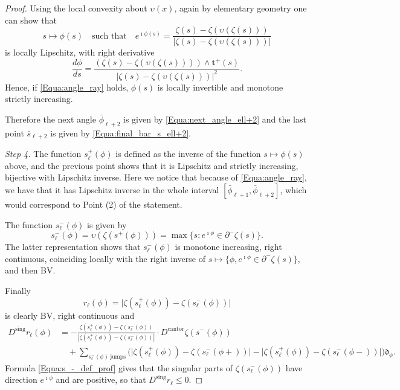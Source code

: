 \documentclass[reqno]{amsart}
\theoremstyle{definition} \newtheorem{definition}{Definition}[section]
\theoremstyle{definition} \newtheorem{remark}[definition]{Remark}
\theoremstyle{plain} \newtheorem{lemma}[definition]{Lemma}
\theoremstyle{plain} \newtheorem{proposition}[definition]{Proposition}
\theoremstyle{plain} \newtheorem{theorem}[definition]{Theorem}
\theoremstyle{plain} \newtheorem{corollary}[definition]{Corollary}
\theoremstyle{definition} \newtheorem{example}[definition]{Example}
\theoremstyle{plain} \newtheorem{claim}[clai]{Claim}
\theoremstyle{definition} \newtheorem{assumption}[definition]{Assumption}
\theoremstyle{definition} \newtheorem{observation}[definition]{Observation}
\newcommand{\sing}{\mathrm{sing}}
\newcommand{\1}{\mathbbm 1}
\newcommand{\Diracd}{\mathfrak{d}}
\renewcommand{\i}{\imath}
\numberwithin{equation}{section} %
\theoremstyle{plain} \newtheorem*{theorem*}{Theorem}
\theoremstyle{plain} \newtheorem{mthm}[maintheorem]{Main Theorem}
\theoremstyle{plain} \newtheorem*{mthm*}{Main Theorem}
\theoremstyle{plain} \newtheorem*{conjecture*}{Conjecture}
\theoremstyle{plain} \newtheorem{conjecture}[definition]{Conjecture}
\theoremstyle{plain} \newtheorem*{problem*}{Problem}
\begin{document}
\begin{proof}
Using the local convexity about $\upsilon(x)$, again by elementary geometry one can show that
\begin{equation*}
s \mapsto \phi(s) \quad \text{such that} \quad e^{\i \phi(s)} = \frac{\zeta(s) - \zeta(\upsilon(\zeta(s)))}{|\zeta(s) - \zeta(\upsilon(\zeta(s)))|}
\end{equation*}
is locally Lipschitz, with right derivative
\begin{equation}
\label{Equa:inverse_der_r_phi}
\frac{d\phi}{ds} = \frac{(\zeta(s) - \zeta(\upsilon(\zeta(s)))) \wedge \mathbf t^+(s)}{|\zeta(s) - \zeta(\upsilon(\zeta(s)))|^2}.
\end{equation}
Hence, if \eqref{Equa:angle_ray} holds, $\phi(s)$ is locally invertible and monotone strictly increasing.

Therefore the next angle $\bar \phi_{\ell+2}$ is given by \eqref{Equa:next_angle_ell+2} and the last point $\bar s_{\ell+2}$ is given by \eqref{Equa:final_bar_s_ell+2}.

\medskip

{\it Step 4.} The function $s^+_\ell(\phi)$ is defined as the inverse of the function $s \mapsto \phi(s)$ above, and the previous point shows that it is Lipschitz and strictly increasing, bijective with Lipschitz inverse. Here we notice that because of \eqref{Equa:angle_ray}, we have that it has Lipschitz inverse in the whole interval $[\bar \phi_{\ell+1},\bar \phi_{\ell+2}]$, which would correspond to Point (2) of the statement.

The function $s^-_\ell(\phi)$ is given by
\begin{equation}
\label{Equa:s_-_def_prof}
s^-_\ell(\phi) = \upsilon(\zeta(s^+(\phi))) = \max \big\{ s : e^{\i \phi} \in \partial^- \zeta(s) \big\}.
\end{equation}
The latter representation shows that $s^-_\ell(\phi)$ is monotone increasing, right continuous, coinciding locally with the right inverse of $s \mapsto \{\phi, e^{\i \phi} \in \partial^- \zeta(s)\}$, and then BV.

Finally
\begin{equation*}
r_\ell(\phi) = \big| \zeta(s^+_\ell(\phi)) - \zeta(s^-_\ell(\phi)) \big|
\end{equation*}
is clearly BV, right continuous and
\begin{equation*}
\begin{split}
D^\sing r_\ell(\phi) &= -\frac{\zeta(s^+_\ell(\phi)) - \zeta(s^-_\ell(\phi))}{|\zeta(s^+_\ell(\phi)) - \zeta(s^-_\ell(\phi))|} \cdot D^{\mathrm{cantor}} \zeta(s^-(\phi)) \\
& \quad + \sum_{s^-_\ell(\phi) \ \text{jumps}} \Big( \big| \zeta(s^+_\ell(\phi)) - \zeta(s^-_\ell(\phi+)) \big| - \big| \zeta(s^+_\ell(\phi)) - \zeta(s^-_\ell(\phi-)) \big| \Big) \Diracd_{\phi}.
\end{split}
\end{equation*}
Formula \eqref{Equa:s_-_def_prof} gives that the singular parts of $\zeta(s^-_\ell(\phi))$ have direction $e^{\i \phi}$ and are positive, so that $D^\sing r_\ell \leq 0$.


\end{proof}
\end{document}
